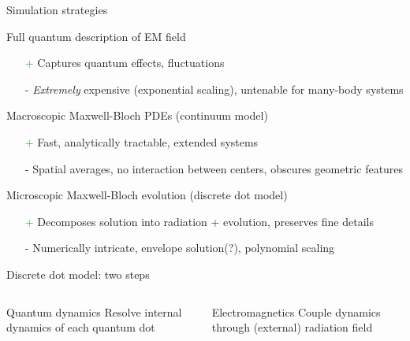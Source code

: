 \documentclass[aspectratio=169, usenames, dvipsnames]{beamer}
\begin{document}
\begin{frame}{Simulation strategies}
  \begin{block}{Full quantum description of EM field}
    \begin{itemize}
      \item[\textcolor{ForestGreen}{+}] Captures quantum effects, fluctuations
      \item[\textcolor{BrickRed}{-}] \emph{Extremely} expensive (exponential scaling), untenable for many-body systems
    \end{itemize}
  \end{block}

  \begin{block}{Macroscopic Maxwell-Bloch PDEs (continuum model)}
    \begin{itemize}
      \item[\textcolor{ForestGreen}{+}] Fast, analytically tractable, extended systems
      \item[\textcolor{BrickRed}{-}] Spatial averages, no interaction between centers, obscures geometric features
    \end{itemize}
  \end{block}

  \begin{block}{Microscopic Maxwell-Bloch evolution (discrete dot model)}
    \begin{itemize}
      \item[\textcolor{ForestGreen}{+}] Decomposes solution into radiation + evolution, preserves fine details
      \item[\textcolor{BrickRed}{-}] Numerically intricate, envelope solution(?), polynomial scaling
    \end{itemize}
  \end{block}
\end{frame}

\begin{frame}{Discrete dot model: two steps}
  \begin{columns}
    \begin{column}{0.5\textwidth}
      \begin{block}{Quantum dynamics}
        Resolve internal dynamics of each quantum dot 
      \end{block}
    \end{column}

    \begin{column}{0.5\textwidth}
      \begin{block}{Electromagnetics}
        Couple dynamics through (external) radiation field 
      \end{block}
    \end{column}
  \end{columns}
\end{frame}
\end{document}
